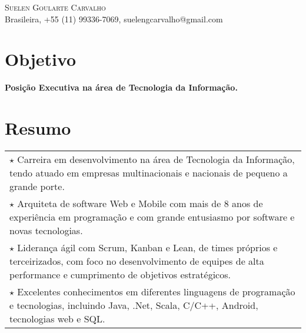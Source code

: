 \documentclass[a4paper, oneside, final]{scrartcl}
\newcommand{\vspc}{\vspace{0.15cm}} %
\begin{document}
\begin{center}
\textsc{\Huge{Suelen Goularte Carvalho}} \vspc\\
{\small Brasileira, +55 (11) 99336-7069, suelengcarvalho@gmail.com} 


\section{Objetivo}
	{\large \bf Posição Executiva na área de Tecnologia da Informação.}



\section{Resumo}
\begin{tabularx}{1\linewidth}{X}
	$\star$ Carreira em desenvolvimento na área de Tecnologia da Informação, tendo atuado em empresas multinacionais e nacionais de pequeno a grande porte. \vspc\\

	$\star$ Arquiteta de software Web e Mobile com mais de 8 anos de experiência em programação e com grande entusiasmo por software e novas tecnologias. \vspc\\
		
	$\star$ Liderança ágil com Scrum, Kanban e Lean, de times próprios e terceirizados, com foco no desenvolvimento de equipes de alta performance e cumprimento de objetivos estratégicos. \vspc\\
	
	$\star$ Excelentes conhecimentos em diferentes linguagens de programação e tecnologias, incluindo Java, .Net, Scala, C/C++, Android, tecnologias web e SQL. \vspc\\
\end{tabularx}



\end{center}
\end{document}
